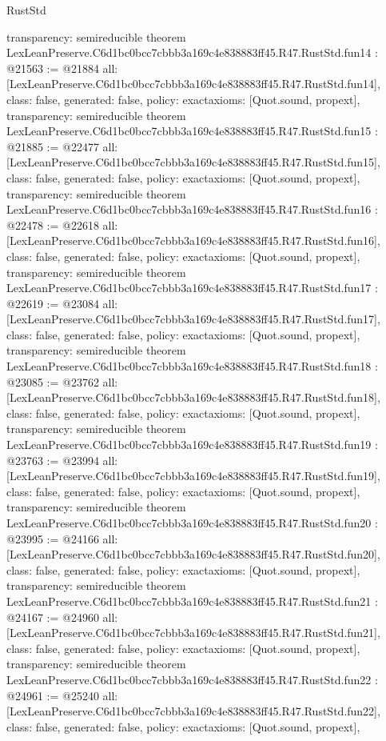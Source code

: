 \begin{lexlean}{RustStd}
\begin{coremodule}
{  transparency: semireducible
}
theorem LexLeanPreserve.C6d1bc0bcc7cbbb3a169c4e838883ff45.R47.RustStd.fun14 : @21563 := @21884 {
  all: [LexLeanPreserve.C6d1bc0bcc7cbbb3a169c4e838883ff45.R47.RustStd.fun14],
  class: false,
  generated: false,
  policy: exact{axioms: [Quot.sound, propext]},
  transparency: semireducible
}
theorem LexLeanPreserve.C6d1bc0bcc7cbbb3a169c4e838883ff45.R47.RustStd.fun15 : @21885 := @22477 {
  all: [LexLeanPreserve.C6d1bc0bcc7cbbb3a169c4e838883ff45.R47.RustStd.fun15],
  class: false,
  generated: false,
  policy: exact{axioms: [Quot.sound, propext]},
  transparency: semireducible
}
theorem LexLeanPreserve.C6d1bc0bcc7cbbb3a169c4e838883ff45.R47.RustStd.fun16 : @22478 := @22618 {
  all: [LexLeanPreserve.C6d1bc0bcc7cbbb3a169c4e838883ff45.R47.RustStd.fun16],
  class: false,
  generated: false,
  policy: exact{axioms: [Quot.sound, propext]},
  transparency: semireducible
}
theorem LexLeanPreserve.C6d1bc0bcc7cbbb3a169c4e838883ff45.R47.RustStd.fun17 : @22619 := @23084 {
  all: [LexLeanPreserve.C6d1bc0bcc7cbbb3a169c4e838883ff45.R47.RustStd.fun17],
  class: false,
  generated: false,
  policy: exact{axioms: [Quot.sound, propext]},
  transparency: semireducible
}
theorem LexLeanPreserve.C6d1bc0bcc7cbbb3a169c4e838883ff45.R47.RustStd.fun18 : @23085 := @23762 {
  all: [LexLeanPreserve.C6d1bc0bcc7cbbb3a169c4e838883ff45.R47.RustStd.fun18],
  class: false,
  generated: false,
  policy: exact{axioms: [Quot.sound, propext]},
  transparency: semireducible
}
theorem LexLeanPreserve.C6d1bc0bcc7cbbb3a169c4e838883ff45.R47.RustStd.fun19 : @23763 := @23994 {
  all: [LexLeanPreserve.C6d1bc0bcc7cbbb3a169c4e838883ff45.R47.RustStd.fun19],
  class: false,
  generated: false,
  policy: exact{axioms: [Quot.sound, propext]},
  transparency: semireducible
}
theorem LexLeanPreserve.C6d1bc0bcc7cbbb3a169c4e838883ff45.R47.RustStd.fun20 : @23995 := @24166 {
  all: [LexLeanPreserve.C6d1bc0bcc7cbbb3a169c4e838883ff45.R47.RustStd.fun20],
  class: false,
  generated: false,
  policy: exact{axioms: [Quot.sound, propext]},
  transparency: semireducible
}
theorem LexLeanPreserve.C6d1bc0bcc7cbbb3a169c4e838883ff45.R47.RustStd.fun21 : @24167 := @24960 {
  all: [LexLeanPreserve.C6d1bc0bcc7cbbb3a169c4e838883ff45.R47.RustStd.fun21],
  class: false,
  generated: false,
  policy: exact{axioms: [Quot.sound, propext]},
  transparency: semireducible
}
theorem LexLeanPreserve.C6d1bc0bcc7cbbb3a169c4e838883ff45.R47.RustStd.fun22 : @24961 := @25240 {
  all: [LexLeanPreserve.C6d1bc0bcc7cbbb3a169c4e838883ff45.R47.RustStd.fun22],
  class: false,
  generated: false,
  policy: exact{axioms: [Quot.sound, propext]},
}
\end{coremodule}
\end{lexlean}

